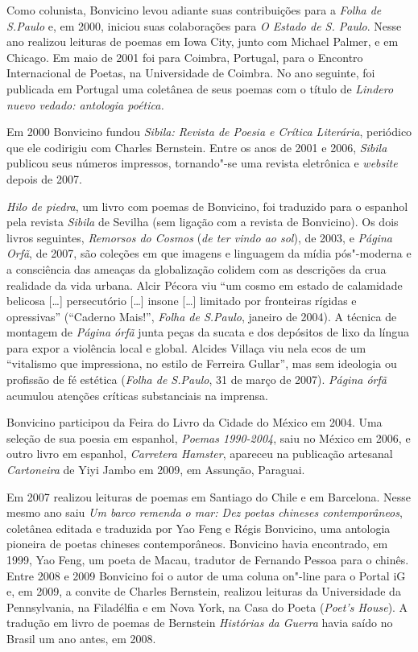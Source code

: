 Como colunista, Bonvicino levou adiante suas contribuições para a
\emph{Folha de S.Paulo} e, em 2000, iniciou suas colaborações para
\emph{O Estado de S. Paulo}. Nesse ano realizou leituras de poemas em
Iowa City, junto com Michael Palmer, e em Chicago. Em maio de 2001 foi
para Coimbra, Portugal, para o  Encontro Internacional de Poetas, na
Universidade de Coimbra. No ano seguinte, foi publicada em Portugal uma
coletânea de seus poemas com o título de \emph{Lindero nuevo vedado:
antologia poética.}

Em 2000 Bonvicino fundou \emph{Sibila: Revista de Poesia e Crítica
Literária}, periódico que ele codirigiu com Charles Bernstein. Entre os
anos de 2001 e 2006, \emph{Sibila} publicou seus números impressos,
tornando"-se uma revista eletrônica e \emph{website} depois de 2007.

\emph{Hilo de piedra}, um livro com poemas de Bonvicino, foi traduzido
para o espanhol pela revista \emph{Sibila} de Sevilha (sem ligação com a
revista de Bonvicino). Os dois livros seguintes, \emph{Remorsos do
Cosmos} (\emph{de ter vindo ao sol}), de 2003, e \emph{Página Orfã}, de
2007, são coleções em que imagens e linguagem da mídia pós"-moderna e a
consciência das ameaças da globalização colidem com as descrições da
crua realidade da vida urbana. Alcir Pécora viu ``um cosmo em estado de
calamidade belicosa {[}\ldots{}{]} persecutório {[}\ldots{}{]} insone
{[}\ldots{}{]} limitado por fronteiras rígidas e opressivas'' (``Caderno
Mais!'', \emph{Folha de S.Paulo}, janeiro de 2004). A técnica de
montagem de \emph{Página órfã} junta peças da sucata e dos depósitos de
lixo da língua para expor a violência local e global. Alcides Villaça
viu nela ecos de um ``vitalismo que impressiona, no estilo de Ferreira
Gullar'', mas sem ideologia ou profissão de fé estética (\emph{Folha de
S.Paulo}, 31 de março de 2007). \emph{Página órfã} acumulou atenções
críticas substanciais na imprensa.

Bonvicino participou da Feira do Livro da Cidade do México em 2004. Uma
seleção de sua poesia em espanhol, \emph{Poemas 1990-2004}, saiu no
México em 2006, e outro livro em espanhol, \emph{Carretera Hamster},
apareceu na publicação artesanal \emph{Cartoneira} de Yiyi Jambo em
2009, em Assunção, Paraguai.

Em 2007 realizou leituras de poemas em Santiago do Chile e em Barcelona.
Nesse mesmo ano saiu \emph{Um barco remenda o mar: Dez poetas chineses
contemporâneos}, coletânea editada e traduzida por Yao Feng e Régis
Bonvicino, uma antologia pioneira de poetas chineses contemporâneos.
Bonvicino havia encontrado, em 1999, Yao Feng, um poeta de Macau,
tradutor de Fernando Pessoa para o chinês. Entre 2008 e 2009 Bonvicino
foi o autor de uma coluna on"-line para o Portal iG e, em 2009, a convite
de Charles Bernstein, realizou leituras da Universidade da Pennsylvania,
na Filadélfia e em Nova York, na Casa do Poeta (\emph{Poet's House}). A
tradução em livro de poemas de Bernstein \emph{Histórias da Guerra}
havia saído no Brasil um ano antes, em 2008.

